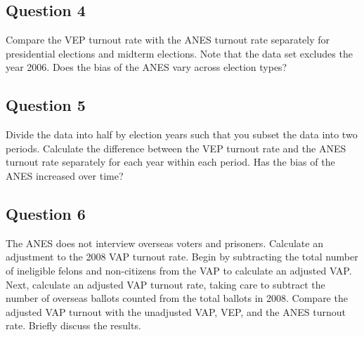 \documentclass[]{article}
\begin{document}
\subsection{Question 4}\label{question-4}

Compare the VEP turnout rate with the ANES turnout rate separately for
presidential elections and midterm elections. Note that the data set
excludes the year 2006. Does the bias of the ANES vary across election
types?

\subsection{Question 5}\label{question-5}

Divide the data into half by election years such that you subset the
data into two periods. Calculate the difference between the VEP turnout
rate and the ANES turnout rate separately for each year within each
period. Has the bias of the ANES increased over time?

\subsection{Question 6}\label{question-6}

The ANES does not interview overseas voters and prisoners. Calculate an
adjustment to the 2008 VAP turnout rate. Begin by subtracting the total
number of ineligible felons and non-citizens from the VAP to calculate
an adjusted VAP. Next, calculate an adjusted VAP turnout rate, taking
care to subtract the number of overseas ballots counted from the total
ballots in 2008. Compare the adjusted VAP turnout with the unadjusted
VAP, VEP, and the ANES turnout rate. Briefly discuss the results.
\end{document}
